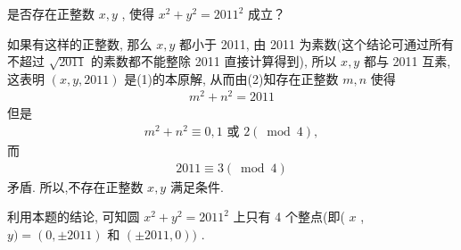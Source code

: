 \begin{example}
	是否存在正整数 $x ,  y$ , 使得 $x^{2}+y^{2}=2011^{2}$ 成立？
\end{example}
\begin{solution}
	如果有这样的正整数, 那么 $x ,  y$ 都小于 2011, 由 2011 为素数(这个结论可通过所有不超过 $\sqrt{2011}$ 的素数都不能整除 2011 直接计算得到), 所以 $x ,  y$ 都与 2011 互素, 这表明 $(x, y, 2011)$ 是(1)的本原解, 从而由(2)知存在正整数 $m ,  n$ 使得
	\begin{align*}
		m^{2}+n^{2}=2011
	\end{align*}
	但是
	\begin{align*}
		m^{2}+n^{2} \equiv 0 ,  1 \text { 或 } 2(\bmod 4),
	\end{align*}
	而
	\begin{align*}
		2011 \equiv 3(\bmod 4)
	\end{align*}
	矛盾. 所以,不存在正整数 $x ,  y$ 满足条件.
\end{solution}
\begin{note}
	利用本题的结论, 可知圆 $x^{2}+y^{2}=2011^{2}$ 上只有 4 个整点(即( $x$ ,  $y)=(0, \pm 2011)$ 和 $( \pm 2011,0))$ .
\end{note}